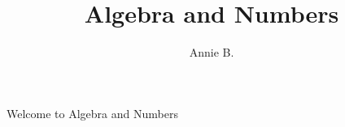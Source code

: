 \documentclass{article}
\title{Algebra and Numbers}
\author{Annie B.}
\begin{document}
  \maketitle
  \newpage

  Welcome to Algebra and Numbers
\end{document}
